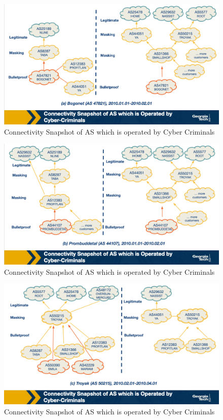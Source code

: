 \documentclass[11pt]{article}
\begin{document}
\begin{figure}[htbp]
\centering
\includegraphics[width=.9\linewidth]{./MD_Figures/9_interconnection_patterns_1.png}
\caption{\label{fig:orgbdf959a}Connectivity Snapshot of AS which is operated by Cyber Criminals}
\end{figure}
\begin{figure}[htbp]
\centering
\includegraphics[width=.9\linewidth]{./MD_Figures/9_interconnection_patterns_2.png}
\caption{\label{fig:orgbdf959a}Connectivity Snapshot of AS which is operated by Cyber Criminals}
\end{figure}
\begin{figure}[htbp]
\centering
\includegraphics[width=.9\linewidth]{./MD_Figures/9_interconnection_patterns_3.png}
\caption{\label{fig:orgbdf959a}Connectivity Snapshot of AS which is operated by Cyber Criminals}
\end{figure}
\end{document}
